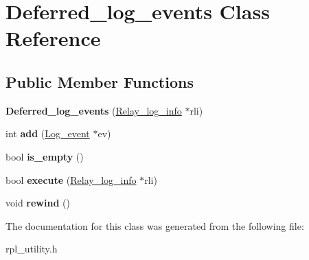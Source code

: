 \hypertarget{classDeferred__log__events}{}\section{Deferred\+\_\+log\+\_\+events Class Reference}
\label{classDeferred__log__events}
\subsection*{Public Member Functions}
\begin{DoxyCompactItemize}
\item 
\mbox{\label{classDeferred__log__events_a58e7101b7e490f3c47918966719b44a6}} 
{\bfseries Deferred\+\_\+log\+\_\+events} (\mbox{\hyperlink{classRelay__log__info}{Relay\+\_\+log\+\_\+info}} $\ast$rli)
\item 
\mbox{\label{classDeferred__log__events_a056f3bc9cb44843c202bc3c39a7aba88}} 
int {\bfseries add} (\mbox{\hyperlink{classLog__event}{Log\+\_\+event}} $\ast$ev)
\item 
\mbox{\label{classDeferred__log__events_a04444149263203ca22fb639edd43b031}} 
bool {\bfseries is\+\_\+empty} ()
\item 
\mbox{\label{classDeferred__log__events_a8bfeb4535efd0a8f628b5f1ffc7ca7af}} 
bool {\bfseries execute} (\mbox{\hyperlink{classRelay__log__info}{Relay\+\_\+log\+\_\+info}} $\ast$rli)
\item 
\mbox{\label{classDeferred__log__events_a95030653e5a69ae402c20bd5e5c2c10c}} 
void {\bfseries rewind} ()
\end{DoxyCompactItemize}


The documentation for this class was generated from the following file\+:\begin{DoxyCompactItemize}
\item 
rpl\+\_\+utility.\+h\end{DoxyCompactItemize}

